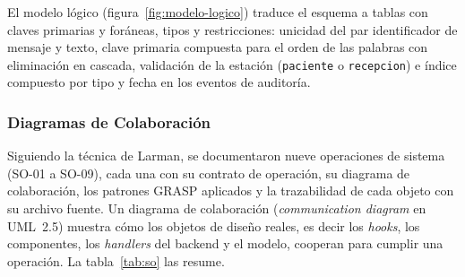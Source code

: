 
El modelo lógico (figura~\ref{fig:modelo-logico}) traduce el esquema a tablas con claves primarias y foráneas, tipos y restricciones: unicidad del par identificador de mensaje y texto, clave primaria compuesta para el orden de las palabras con eliminación en cascada, validación de la estación (\texttt{paciente} o \texttt{recepcion}) e índice compuesto por tipo y fecha en los eventos de auditoría.


\subsubsection{Diagramas de Colaboración}

Siguiendo la técnica de Larman, se documentaron nueve operaciones de sistema (SO-01 a SO-09), cada una con su contrato de operación, su diagrama de colaboración, los patrones GRASP aplicados y la trazabilidad de cada objeto con su archivo fuente. Un diagrama de colaboración (\emph{communication diagram} en UML~2.5) muestra cómo los objetos de diseño reales, es decir los \emph{hooks}, los componentes, los \emph{handlers} del backend y el modelo, cooperan para cumplir una operación. La tabla~\ref{tab:so} las resume.

